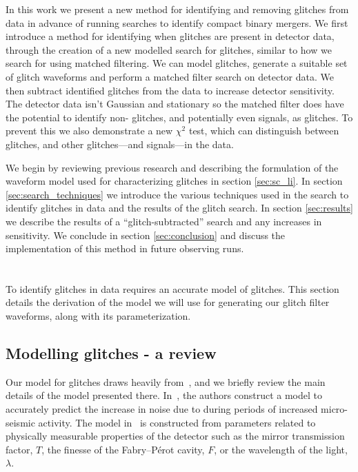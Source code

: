 In this work we present a new method for identifying and removing \scl{} glitches from \gw{} data in advance of running searches to identify compact binary mergers.
We first introduce a method for identifying when \scl{} glitches are present in detector data, through the creation of a new modelled search for \scl{} glitches, similar to how we search for \gws{} using matched filtering. We can model \scl{} glitches, generate a suitable set of glitch waveforms and perform a matched filter search on detector data. We then subtract identified glitches from the data to increase detector sensitivity. The detector data isn't Gaussian and stationary so the matched filter does have the potential to identify non-\scl{} glitches, and potentially even \gw{} signals, as \scl{} glitches. To prevent this we also demonstrate a new \scl{} $\chi^{2}$ test, which can distinguish between \scl{} glitches, and other glitches---and \gw{} signals---in the data.

We begin by reviewing previous research and describing the formulation of the waveform model used for characterizing \scl{} glitches in section \ref{sec:sc_li}. In section \ref{sec:search_techniques} we introduce the various techniques used in the search to identify \scl{} glitches in \gw{} data and the results of the \scl{} glitch search. In section \ref{sec:results} we describe the results of a ``glitch-subtracted'' \gw{} search and any increases in sensitivity. We conclude in section \ref{sec:conclusion} and discuss the implementation of this method in future observing runs.

\section{\label{sec:sc_li}\Scl{}}

To identify \scl{} glitches in \gw{} data requires an accurate model of \scl{} glitches. This section details the derivation of the model we will use for generating our \scl{} glitch filter waveforms, along with its parameterization.

\subsection{Modelling \scl{} glitches - a review}

Our model for \scl{} glitches draws heavily from~\cite{TAccadia}, and we briefly review the main details of the model presented there. In~\cite{TAccadia}, the authors construct a model to accurately predict the increase in noise due to \scl{} during periods of increased micro-seismic activity. The model in~\cite{TAccadia} is constructed from parameters related to physically measurable properties of the detector such as the mirror transmission factor, $T$, the finesse of the Fabry–Pérot cavity, $F$, or the wavelength of the light, $\lambda$.

